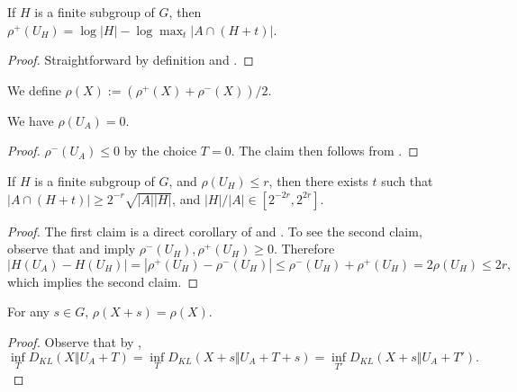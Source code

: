 \begin{corollary}\label{rhoplus-subgroup}\leanok If $H$ is a finite subgroup of $G$, then $\rho^+(U_H) = \log |H| - \log \max_t |A \cap (H+t)|$.
\end{corollary}

\begin{proof} Straightforward by definition and .
\end{proof}

\begin{definition}\label{rho-def}\leanok  We define $\rho(X) := (\rho^+(X) + \rho^-(X))/2$.
\end{definition}

\begin{lemma}\label{rho-init}\label{rho_of_uniform}\leanok  We have $\rho(U_A) = 0$.
\end{lemma}

\begin{proof} $\rho^-(U_A)\le 0$ by the choice $T=0$. The claim then follows from .
\end{proof}

\begin{lemma}\label{rho-subgroup}\leanok  If $H$ is a finite subgroup of $G$, and $\rho(U_H) \leq r$, then there exists $t$ such that $|A \cap (H+t)| \geq 2^{-r} \sqrt{|A||H|}$, and $|H|/|A|\in[2^{-2r},2^{2r}]$.
\end{lemma}

\begin{proof} The first claim is a direct corollary of  and . To see the second claim, observe that  and  imply $\rho^-(U_H),\rho^+(U_H)\ge 0$. Therefore $$|H(U_A)-H(U_H)|=|\rho^+(U_H)-\rho^-(U_H)|\le \rho^-(U_H)+\rho^+(U_H)= 2\rho(U_H)\le 2r,$$
  which implies the second claim.
\end{proof}

\begin{lemma}\label{rho-invariant}\leanok{}  For any $s \in G$, $\rho(X+s) = \rho(X)$.
\end{lemma}

\begin{proof} Observe that by , $$\inf_T D_{KL}(X\Vert U_A+T)=\inf_T D_{KL}(X+s\Vert U_A+T+s)=\inf_{T'} D_{KL}(X+s\Vert U_A+T').$$
\end{proof}

